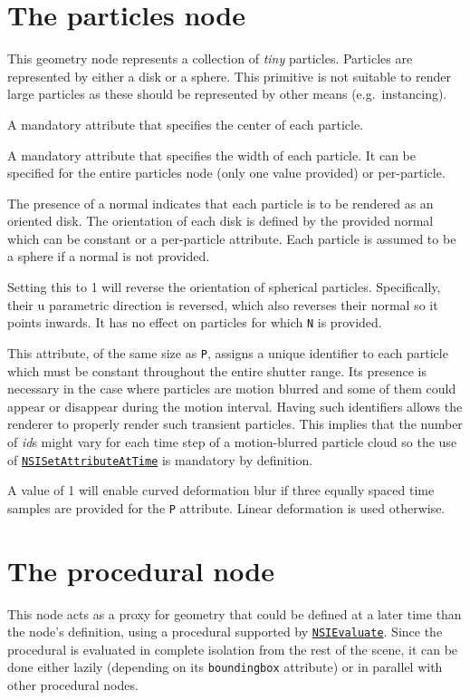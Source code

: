 \documentclass[oneside,ebook]{memoir}
\newcommand{\paramlistitemTN}[2]{\item[#2\textcolor{lightgray}{\dotfill}#1]}
\newcommand{\paramlistitemTND}[3]{\paramlistitemTN{#1 {\rmfamily({\ttfamily#3})}}{#2}}
\begin{document}
\section{The particles node}
\label{section:particlesnode}
This geometry node represents a collection of \emph{tiny} particles.
Particles are represented by either a disk or a sphere.
This primitive is not suitable to render large particles as these should be represented by other means (e.g.\ instancing).
\begin{paramlist}
\paramlistitemTN{point}{P}
A mandatory attribute that specifies the center of each particle.
\paramlistitemTN{float}{width}
A mandatory attribute that specifies the width of each particle.
It can be specified for the entire particles node (only one value provided) or per-particle.
\paramlistitemTN{normal}{N}
The presence of a normal indicates that each particle is to be rendered as an oriented disk.
The orientation of each disk is defined by the provided normal which can be constant or a per-particle attribute.
Each particle is assumed to be a sphere if a normal is not provided.
\paramlistitemTND{int}{reverseorientation}{0}
Setting this to 1 will reverse the orientation of spherical particles. Specifically, their u parametric direction is reversed, which also reverses their normal so it points inwards. It has no effect on particles for which \lstinline|N| is provided.
\paramlistitemTN{int}{id}
This attribute, of the same size as \lstinline|P|, assigns a unique identifier to each particle which must be constant throughout the entire shutter range.
Its presence is necessary in the case where particles are motion blurred and some of them could appear or disappear during the motion interval.
Having such identifiers allows the renderer to properly render such transient particles. This implies that the number of \textit{id}s might vary for each time step of a motion-blurred particle cloud so the use of \hyperref[CAPI:nsisetattributeattime]{\lstinline|NSISetAttributeAtTime|} is mandatory by definition.
\paramlistitemTND{int}{quadraticmotion}{0}
A value of 1 will enable curved deformation blur if three equally spaced time samples are provided for the \lstinline|P| attribute. Linear deformation is used otherwise.
\end{paramlist}

\section{The procedural node}
\label{section:proceduralnode}
This node acts as a proxy for geometry that could be defined at a later time than the node's definition, using a procedural supported by \hyperref[CAPI:nsievaluate]{\lstinline|NSIEvaluate|}.
Since the procedural is evaluated in complete isolation from the rest of the scene, it can be done either lazily (depending on its \lstinline|boundingbox| attribute) or in parallel with other procedural nodes.
\end{document}
